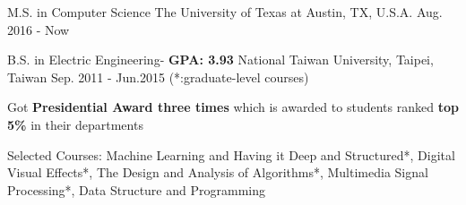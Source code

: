 


\begin{cventries}

\cventry
{M.S. in Computer Science} %
{The University of Texas at Austin, TX, U.S.A.} %
{Aug. 2016 -  Now} %
{} %
{}%


\cventry
{B.S. in Electric Engineering- \textbf{GPA: 3.93}}%
{National Taiwan University, Taipei, Taiwan} %
{Sep. 2011 - Jun.2015} %
{(*:graduate-level courses)} %
{ %
\begin{cvitems}
\item {Got \textbf{Presidential Award three times} which is awarded to students ranked  \textbf{top 5\%} in their departments}
\item {Selected Courses:  Machine Learning and Having it Deep and Structured*, Digital Visual Effects*, The Design and Analysis of Algorithms*, Multimedia Signal
Processing*, Data Structure and Programming}
\end{cvitems}
}


\end{cventries}